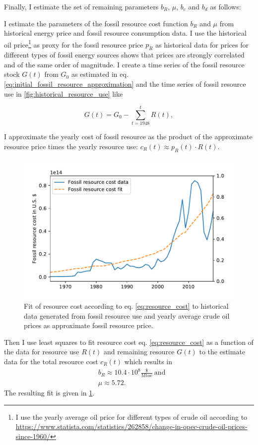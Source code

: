 Finally, I estimate the set of remaining parameters $b_R$, $\mu$, $b_c$ and $b_d$ as follows:

I estimate the parameters of the fossil resource cost function $b_R$ and $\mu$ from historical energy price and fossil resource consumption data. I use the historical oil price\footnote{I use the yearly average oil price for different types of crude oil according to \url{https://www.statista.com/statistics/262858/change-in-opec-crude-oil-prices-since-1960/}} as proxy for the fossil resource price $p_R$ as historical data for prices for different types of fossil energy sources \citep{owidfossilfuels} shows that prices are strongly correlated and of the same order of magnitude. I create a time series of the fossil resource stock $G(t)$ from $G_0$ as estimated in eq. \ref{eq:initial_fossil_resource_approximation} and the time series of fossil resource use in \cref{fig:historical_resource_use} like

\begin{equation} 
  G(t) = G_0 - \sum_{t=1948}^{t}R(t),
  \label{eq:fossil_resource_time_series}
\end{equation}

I approximate the yearly cost of fossil resource as the product of the approximate resource price times the yearly resource use: $c_R(t) \approx p_R(t) \cdot R(t)$. 
\begin{figure}
	\vspace{-.4 cm}
        \hspace{-1.25 cm}
        \includegraphics[width = .67 \textwidth]{./figures/resource_price_fit.pdf}
        \caption[Fit of model resource cost function to historical data]{Fit of resource cost according to eq. \ref{eq:resource_cost} to historical data generated from fossil resource use and yearly average crude oil prices as approximate fossil resource price. \label{fig:resource_cost_fit}}
\end{figure}
Then I use least squares to fit resource cost eq. \ref{eq:resource_cost} as a function of the data for resource use $R(t)$ and remaining resource $G(t)$ to the estimate data for the total resource cost $c_R(t)$ which results in 
\begin{align}
  &b_R \approx 10.4 \cdot 10^{8} \frac{\$}{\mathrm{Mtoe}} ~ \mathrm{and}\\
  & \mu \approx 5.72.
  \label{eq:estimate_resource_cost}
\end{align}
The resulting fit is given in \cref{fig:resource_cost_fit}.

